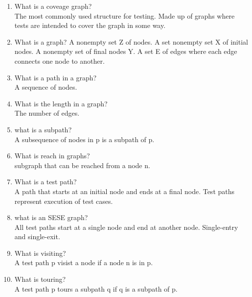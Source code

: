 \documentclass[10pt]{article}
\begin{document}
\begin{enumerate}
    \item What is a coveage graph?\\
          The most commonly used structure for testing. Made up of graphs where tests are intended to cover the graph in some way.\\

    \item What is a graph?
          A nonempty set Z of nodes. A set nonempty set X of initial nodes. A nonempty set of final nodes Y. A set E of edges where each edge connects one node to another.\\

    \item What is a path in a graph?\\
          A sequence of nodes.\\

    \item What is the length in a graph?
          \\ The number of edges.\\

    \item what is a subpath?\\
          A subsequence of nodes in p is a subpath of p.\\

    \item What is reach in graphs?\\
          subgraph that can be reached from a node n.\\

    \item What is a test path?
          \\ A path that starts at an initial node and ends at a final node. Test paths represent execution of test cases.\\

    \item what is an SESE graph?\\
          All test paths start at a single node and end at another node. Single-entry and single-exit.\\

    \item What is visiting?
          \\ A test path p visist a node if a node n is in p.\\
    \item What is touring?\\
          A test path p tours a subpath q if q is a subpath of p.\\


\end{enumerate}
\end{document}
